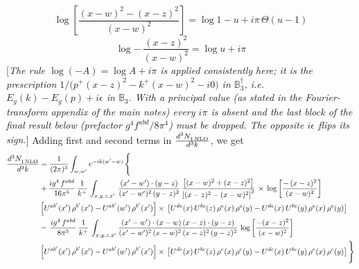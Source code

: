 \documentclass[9pt]{article}
\def\mf#1{\mathbb{#1}}
\newcommand{\rnote}[1]{{\color{teal}[\textit{#1}]}}
\numberwithin{equation}{section}
\begin{document}
$$\log{\left[\frac{(x-w)^{2}-(x-z)^{2}}{(x-w)^{2}}\right]} = \log{1-u} + i\pi\,\Theta(u-1)$$
$$\log{-\,\frac{(x-z)^{2}}{(x-w)^{2}}} = \log{u} + i\pi$$
\rnote{The rule $\log(-A)=\log A+i\pi$ is applied consistently here; it is the prescription $1/\big(p^{+}(x-z)^{2}-k^{+}(x-w)^{2}-i0\big)$ in $\mf{B}_{3}^{\dagger}$, i.e. $E_{g}(k)-E_{g}(p)+i\epsilon$ in $\mf{B}_{3}$. With a principal value (as stated in the Fourier-transform appendix of the main notes) every $i\pi$ is absent and the last block of the final result below (prefactor $g^{4}f^{abd}/8\pi^{4}$) must be dropped. The opposite $i\epsilon$ flips its sign.}
Adding first and second terms in $ \frac{d^{3}N_{1\,\rm NLO}^{\rm}}{d^{3}k} $, we get
\begin{align}
   \frac{d^{3}N_{1\,\rm NLO}^{\rm}}{d^{3}k}  & =  \frac{1}{(2\pi)^{3}}  \int_{w, w^\prime} e^{-ik(w^\prime-w)}\, \Bigg\{\notag \\
&  +\frac{ig^{4}\,f^{abd}}{16\pi^{5}}\, \frac{1}{k^{+}}\,\int_{x,y,z,x'}\, \frac{(x'-w')\cdot (y-z)}{(x'-w')^{2}\,(y-z)^{2}}\, \frac{\left[(x-w)^{2}+(x-z)^{2}\right]}{\left[(x-z)^{2}-(x-w)^{2}\right]^{2}}\, \times\, \log{\left[\frac{-\,(x-z)^{2}}{(x-w)^{2}}\right]}\notag \\ & \left[U^{ab'}(x')\,\rho^{b'}(x')-U^{ab'}(w')\, \rho^{b'}(x')\right]\times\, \left[U^{de}(x)\,U^{bc}(z)\, \rho^{e}(x)\,\rho^{c}(y)-U^{de}(x)\,U^{bc}(y)\,\rho^{e}(x)\,\rho^{c}(y)\right] \notag \\
& -\, \frac{ig^{4}\,f^{abd}}{8\pi^{5}}\,\frac{1}{k^{+}}\,\int_{x,y,z,x'}\frac{(x'-w')\cdot (x-w)\, (x-z)\cdot (y-z)}{(x'-w')^{2}\, (x-w)^{2}\, (x-z)^{2}\, (y-z)^{2}}\,\log{\left[\frac{-(x-z)^{2}}{(x-w)^{2}}\right]} \notag \\ & \left[U^{ab'}(x')\,\rho^{b'}(x')-U^{ab'}(w')\, \rho^{b'}(x')\right]\times\, \left[U^{de}(x)\,U^{bc}(z)\, \rho^{e}(x)\,\rho^{c}(y)-U^{de}(x)\,U^{bc}(y)\,\rho^{e}(x)\,\rho^{c}(y)\right]\Bigg\}
\end{align}
\end{document}
